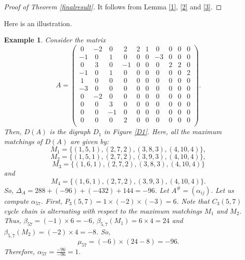 \documentclass[notitlepage,12pt,reqno]{amsart}
\newtheorem{thm}{Theorem}[section]
\newtheorem{ex}[thm]{Example}
\numberwithin{equation}{section}
\begin{document}
\begin{proof}[Proof of Theorem \ref{finalresult}]
It follows from Lemma \ref{1}, \ref{2} and \ref{3}.
\end{proof}
Here is an illustration.
\begin{ex}
Consider the matrix
$$A=\begin{pmatrix}
~0 & -2 & ~0 & ~2 & 2 & 1 & ~0 & 0 & 0 & 0\\
-1 & ~0 & ~1 & ~0 & 0 & 0 & -3 & 0 & 0 & 0\\
~0 & ~3 & ~0 & -1 & 0 & 0 & ~0 & 2 & 2 & 0\\
-1 & ~0 & ~1 & ~0 & 0 & 0 & ~0 & 0 & 0 & 2\\
~1 & ~0 & ~0 & ~0 & 0 & 0 & ~0 & 0 & 0 & 0\\
-3 & ~0 & ~0 & ~0 & 0 & 0 & ~0 & 0 & 0 & 0 \\
~0 & -2 & ~0 & ~0 & 0 & 0 & ~0 & 0 & 0 & 0\\
~0 & ~0 & ~3 & ~0 & 0 & 0 & ~0 & 0 & 0 & 0\\
~0 & ~0 & -1 & ~0 & 0 & 0 & ~0 & 0 & 0 & 0\\
~0 & ~0 & ~0 & ~2 & 0 & 0 & ~0 & 0 & 0 & 0\\
\end{pmatrix}.$$
Then, $D(A)$ is the digraph $D_1$ in Figure \ref{D1}. Here, all the maximum matchings of $D(A)$ are given by: 
$$M_1=\{(1,5,1),(2,7,2),(3,8,3),(4,10,4)\},$$
$$M_2=\{(1,5,1),(2,7,2),(3,9,3),(4,10,4)\},$$
$$M_3=\{(1,6,1),(2,7,2),(3,8,3),(4,10,4)\}$$
and
$$M_4=\{(1,6,1),(2,7,2),(3,9,3),(4,10,4)\}.$$
So, $\Delta _A=288+(-96)+(-432)+144=-96$. Let $A^{\#}=(\alpha _{ij})$. Let us compute $\alpha _{57}$. First, $P_3(5,7)=1\times (-2)\times (-3)=6$. Note that $C_3(5,7)$ cycle chain is alternating with respect to the maximum matchings $M_1$ and $M_2$. Thus, $\beta _{57}=(-1)\times 6=-6$, $\beta _{\overline{5,7}}(M_1)=6\times 4=24$ and $\beta _{\overline{5,7}}(M_2)=(-2)\times 4=-8$. So,
$$\mu _{57}=(-6)\times (24-8)=-96.$$
Therefore, $\alpha _{57}=\frac{-96}{-96}=1$.
\end{ex}
\end{document}
